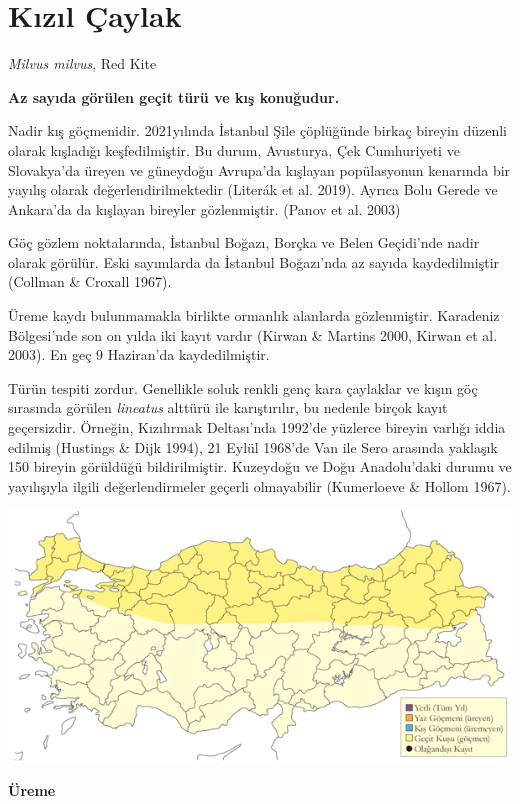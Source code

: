 \documentclass[
  letterpaper,
  DIV=11,
  numbers=noendperiod]{scrreprt}
\begin{document}
\section{Kızıl Çaylak}\label{kux131zux131l-uxe7aylak}

\emph{Milvus milvus}, Red Kite

\textbf{Az sayıda görülen geçit türü ve kış konuğudur.}

Nadir kış göçmenidir. 2021yılında İstanbul Şile çöplüğünde birkaç
bireyin düzenli olarak kışladığı keşfedilmiştir. Bu durum, Avusturya,
Çek Cumhuriyeti ve Slovakya'da üreyen ve güneydoğu Avrupa'da kışlayan
popülasyonun kenarında bir yayılış olarak değerlendirilmektedir (Literák
et al. 2019). Ayrıca Bolu Gerede ve Ankara'da da kışlayan bireyler
gözlenmiştir. (Panov et al. 2003)

Göç gözlem noktalarında, İstanbul Boğazı, Borçka ve Belen Geçidi'nde
nadir olarak görülür. Eski sayımlarda da İstanbul Boğazı'nda az sayıda
kaydedilmiştir (Collman \& Croxall 1967).

Üreme kaydı bulunmamakla birlikte ormanlık alanlarda gözlenmiştir.
Karadeniz Bölgesi'nde son on yılda iki kayıt vardır (Kirwan \& Martins
2000, Kirwan et al. 2003). En geç 9 Haziran'da kaydedilmiştir.

Türün tespiti zordur. Genellikle soluk renkli genç kara çaylaklar ve
kışın göç sırasında görülen \emph{lineatus} alttürü ile karıştırılır, bu
nedenle birçok kayıt geçersizdir. Örneğin, Kızılırmak Deltası'nda
1992'de yüzlerce bireyin varlığı iddia edilmiş (Hustings \& Dijk 1994),
21 Eylül 1968'de Van ile Sero arasında yaklaşık 150 bireyin görüldüğü
bildirilmiştir. Kuzeydoğu ve Doğu Anadolu'daki durumu ve yayılışıyla
ilgili değerlendirmeler geçerli olmayabilir (Kumerloeve \& Hollom 1967).

\includegraphics{images/harita_Page_106.png}

\textbf{Üreme}
\end{document}
